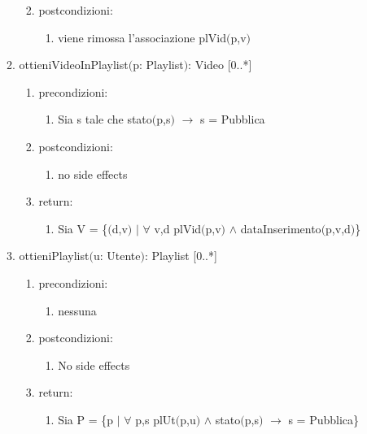 \documentclass{article}
\begin{document}
\begin{enumerate}
\begin{enumerate}
\begin{enumerate}
\begin{enumerate}
            \end{enumerate}
            \item postcondizioni:
            \begin{enumerate}
                \item viene rimossa l'associazione plVid$($p,v$)$
            \end{enumerate}
        \end{enumerate}
        \newpage
        \item ottieniVideoInPlaylist$($p: Playlist$)$: Video [0..*]
        \begin{enumerate}
            \item precondizioni:
            \begin{enumerate}
                \item Sia s tale che stato$($p,s$)$ $\rightarrow$ s = Pubblica
            \end{enumerate}
            \item postcondizioni:
            \begin{enumerate}
                \item no side effects
            \end{enumerate}
            \item return:
            \begin{enumerate}
                \item Sia V = \{$($d,v$)$ $|$ $\forall$ v,d plVid$($p,v$)$ $\land$ dataInserimento$($p,v,d$)$\}
            \end{enumerate}
        \end{enumerate}
        \newpage
        \item ottieniPlaylist$($u: Utente$)$: Playlist [0..*]
        \begin{enumerate}
            \item precondizioni:
            \begin{enumerate}
                \item nessuna
            \end{enumerate}
            \item postcondizioni:
            \begin{enumerate}
                \item No side effects
            \end{enumerate}
            \item return:
            \begin{enumerate}
                \item Sia P = \{p $|$ $\forall$ p,s plUt$($p,u$)$ $\land$ stato$($p,s$)$ $\rightarrow$ s = Pubblica\}

\end{enumerate}
\end{enumerate}
\end{enumerate}
\end{enumerate}
\end{document}
